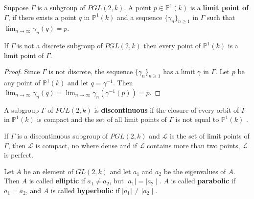 \begin{definition*} \cite{gvdp}
Suppose $\Gamma$ is a subgroup of $PGL(2,k)$. A point $p  \in \mathbb{P}^1(k)$ is a \textbf{limit point of $\Gamma$}, if there exists a point $q$ in  $\mathbb{P}^1(k)$ and a sequence $\{\gamma_n\}_{n\geq 1}$ in $\Gamma$ such that $\lim_{n\to\infty} \gamma_n(q) = p$.
\end{definition*}

\begin{proposition*} \cite{gvdp} If $\Gamma$ is not a discrete subgroup of $PGL(2,k)$ then every point of  $\mathbb{P}^1(k)$ is a limit point of $\Gamma$.
\end{proposition*}	

\begin{proof} 
Since $\Gamma$ is not discrete, the sequence  $\{\gamma_n\}_{n\geq 1}$ has a limit $\gamma$ in $\Gamma$. Let $p$ be any point of $\mathbb{P}^1(k)$ and let $q= \gamma^{-1}$. Then $\lim_{n\to\infty} \gamma_n(q) = \lim_{n\to\infty} \gamma_n(\gamma^{-1}(p)) =p$. 
\end{proof}	

\begin{definition*} \cite{gvdp} A subgroup $\Gamma$ of $PGL(2,k)$ is \textbf{discontinuous} if the closure of every orbit of $\Gamma$ in $\mathbb{P}^1(k)$ is compact and the set of all limit points of $\Gamma$ is not equal to  $\mathbb{P}^1(k)$ .
\end{definition*}

\begin{proposition*} \cite{gvdp} If $\Gamma$ is a discontinuous subgroup of $PGL(2,k)$  and $\mathcal{L}$ is the set of limit points of $\Gamma$, then $\mathcal{L}$ is compact, no where dense and if $\mathcal{L}$ contains more than two points, $\mathcal{L}$ is perfect.
\end{proposition*}

\begin{definition} \cite{gvdp}
Let $A$ be an element of $GL(2,k)$ and let $a_1$ and $a_2$  be the eigenvalues of $A$. Then $A$ is called \textbf{elliptic} if $a_1 \neq a_2$, but $\mid a_1\mid = \mid a_2\mid$. $A$ is called \textbf{parabolic} if $a_1 = a_2$, and $A$ is called \textbf{hyperbolic} if  $\mid a_1\mid \neq \mid a_2\mid$.
\end{definition}

